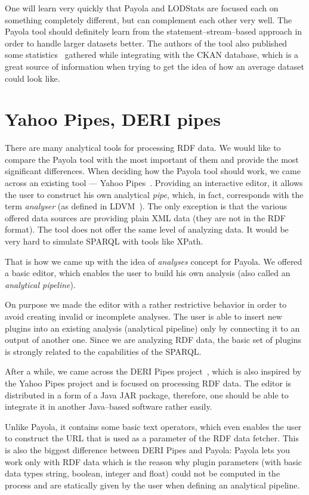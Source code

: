 One will learn very quickly that Payola and LODStats are focused each 
on something completely different, but can complement each other very well. The Payola 
tool should definitely learn from the statement--stream--based approach in order 
to handle larger datasets better. The authors of the tool also published
some statistics~\cite{lodstats} gathered while integrating with the CKAN database, which is a 
great source of information when trying to get the idea of how an average dataset 
could look like. 

\section{Yahoo Pipes, DERI pipes}
There are many analytical tools for processing RDF data. We would like to 
compare the Payola tool with the most important of them and provide the most significant 
differences. When deciding how the Payola tool should work, we came 
across an existing tool --- Yahoo 
Pipes~\cite{yahoo-pipes}. Providing an interactive 
editor, it allows the user to construct his own analytical \emph{pipe}, 
which, in fact, corresponds with the term \emph{analyser} (as defined in LDVM~\cite{ldvm}).
The only exception is that the various offered data sources are
providing plain XML data (they are not in the RDF format).
The tool does not offer the same level of analyzing data.
It would be very hard to simulate SPARQL with tools like XPath.

That is how we came up with the idea of \emph{analyses} concept for Payola. 
We offered a basic editor, which enables the user to build his own analysis
(also called an \emph{analytical pipeline}).
 
On purpose we made the editor with a rather restrictive behavior in order to 
avoid creating invalid or incomplete analyses. The user is able to insert new 
plugins into an existing analysis (analytical pipeline) only by connecting it to an output of another 
one. Since we are analyzing RDF data, the basic set of plugins is strongly 
related to the capabilities of the SPARQL.

After a while, we came across the DERI Pipes 
project~\cite{deri-pipes}, which is also inspired by the Yahoo 
Pipes project and is focused on processing RDF data. The editor is distributed 
in a form of a Java JAR package, therefore, one should be able to integrate it in another
Java--based software rather easily.

Unlike Payola, it contains some basic text operators, which even enables the user  
to construct the URL that is used as a parameter of the RDF data fetcher. This 
is also the biggest difference between DERI Pipes and Payola: Payola lets 
you work only with RDF data which is the reason why plugin parameters (with basic data types string,
boolean, integer and float) could not be computed in the process and are 
statically given by the user when defining an analytical pipeline.

